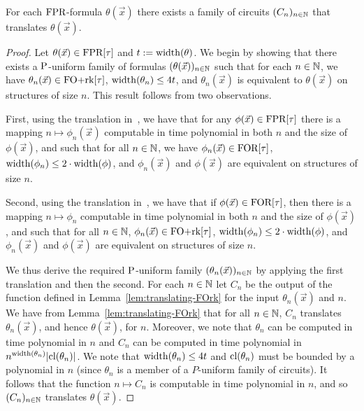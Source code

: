 \documentclass[../paper.tex]{subfiles}
\begin{document}
\begin{thm}
  For each $\text{\upshape FPR}$-formula $\theta(\vec{x})$ there exists a family of circuits
  $(C_n)_{n \in \mathbb{N}}$ that translates $\theta(\vec{x})$.
  \label{thm:translating-formulas-to-circuits}
\end{thm}
\begin{proof}
  Let $\theta(\vec{x}) \in \text{\upshape FPR}[\tau]$ and $t := \mathrm{width} (\theta)$. We begin by
  showing that there exists a $\mathrm{P}$-uniform family of formulas
  $(\theta(\vec{x}))_{n \in \mathbb{N}}$ such that for each $n \in \mathbb{N}$, we have
  $\theta_n(\vec{x}) \in \text{\upshape FO+rk}[\tau]$, $\mathrm{width}(\theta_n) \leq 4 t$, and
  $\theta_n(\vec{x})$ is equivalent to $\theta(\vec{x})$ on structures of size
  $n$. This result follows from two observations.

  First, using the translation in~\cite{Dawar09logicswith}, we have that for any
  $\phi(\vec{x}) \in \text{\upshape FPR}[\tau]$ there is a mapping $n \mapsto \phi_n(\vec{x})$
  computable in time polynomial in both $n$ and the size of $\phi(\vec{x})$, and
  such that for all $n \in \mathbb{N}$, we have $\phi_n(\vec{x}) \in \text{\upshape FOR}[\tau]$,
  $\mathrm{width} (\phi_n) \leq 2 \cdot \mathrm{width} (\phi)$, and $\phi_n(\vec{x})$ and
  $\phi(\vec{x})$ are equivalent on structures of size $n$.

  Second, using the translation in~\cite{libkin2004elements}, we have that if
  $\phi (\vec{x}) \in \text{\upshape FOR}[\tau]$, then there is a mapping $n \mapsto \phi_n$
  computable in time polynomial in both $n$ and the size of $\phi(\vec{x})$, and
  such that for all $n \in \mathbb{N}$, $\phi_n(\vec{x}) \in \text{\upshape FO+rk}[\tau]$,
  $\mathrm{width}(\phi_n) \leq 2 \cdot \mathrm{width}(\phi)$, and $\phi_n(\vec{x})$ and
  $\phi(\vec{x})$ are equivalent on structures of size $n$.

  We thus derive the required $\mathrm{P}$-uniform family $(\theta_n(\vec{x}))_{n \in
    \mathbb{N}}$ by applying the first translation and then the second. For each $n
  \in \mathbb{N}$ let $C_n$ be the output of the function defined in
  Lemma~\ref{lem:translating-FOrk} for the input $\theta_n(\vec{x})$ and $n$. We
  have from Lemma~\ref{lem:translating-FOrk} that for all $n \in \mathbb{N}$, $C_n$
  translates $\theta_n(\vec{x})$, and hence $\theta(\vec{x})$, for $n$.
  Moreover, we note that $\theta_n$ can be computed in time polynomial in $n$
  and $C_n$ can be computed in time polynomial in $n^{\mathrm{width}(\theta_n)} \vert
  \mathrm{cl}(\theta_n) \vert$. We note that $\mathrm{width}(\theta_n) \leq 4t$ and
  $\mathrm{cl}(\theta_n)$ must be bounded by a polynomial in $n$ (since $\theta_n$ is a
  member of a $P$-uniform family of circuits). It follows that the function $n
  \mapsto C_n$ is computable in time polynomial in $n$, and so $(C_n)_{n \in
    \mathbb{N}}$ translates $\theta(\vec{x})$.
\end{proof}
\end{document}
